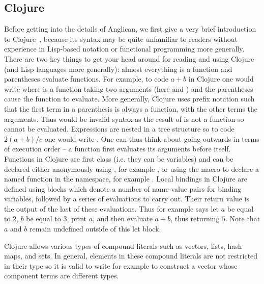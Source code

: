 \subsection{Clojure}
\label{sec:probprog:anglican:clojure} 

Before getting into the details of Anglican, we first give a very brief introduction to Clojure~\citep{hickey2008clojure},
because its syntax may be quite unfamiliar to readers without experience in Lisp-based notation or functional programming
more generally.  There are two key things to get your head around for reading and using Clojure (and Lisp languages more
generally): almost everything is a function and parentheses evaluate functions.  For example, to code $a+b$ in Clojure one
would write {\small {}} where \clj{+} is a function taking two arguments (here  and ) and the parentheses cause the
function to evaluate.  More generally, Clojure uses prefix notation such that 
the first term in a parenthesis is always a function, with the other terms the arguments.
Thus {\small {}} would be invalid syntax as the result of {\small {}}  is not a function so cannot be evaluated.
Expressions are nested in a tree structure so to code $2(a+b)/c$ one would write {\small {}}.  One can
thus think about going outwards in terms of execution order -- a function first evaluates its arguments before
itself.  Functions in Clojure are first class (i.e. they can be variables) and can be declared either anonymously using
{\small {}}, for example {\small {}}, or using the
macro  to declare a named function in the namespace, for example {\small {}}.
Local bindings in Clojure are defined using \cllet blocks which denote a number of name-value pairs for
binding variables, followed by a series of evaluations to  carry out. Their return value
is the output of the last of these evaluations.  Thus for example
{\small {}} says let $a$ be equal to $2$, $b$ be equal to $3$, print $a$,
and then evaluate $a+b$, thus returning $5$.  Note that $a$ and $b$ remain undefined outside of this let block.  

Clojure allows various types of compound literals such as vectors, lists, hash maps, and sets.
In general, elements in these compound literals are not restricted in
their type so it is valid to write for example {\small \lsi{[1 (fn [x] (inc x)) "2"]}} to construct a vector 
whose component terms are different types.


